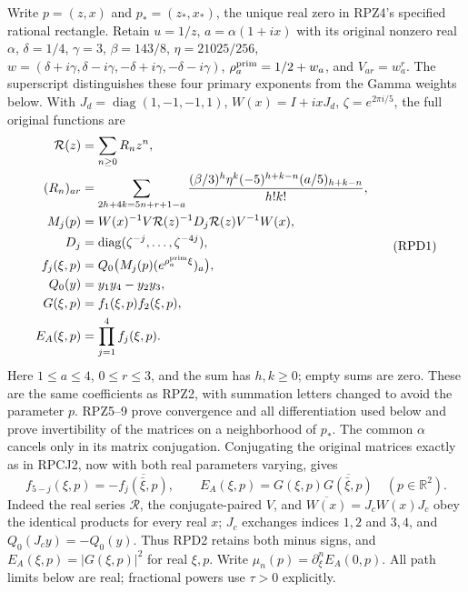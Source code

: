 Write $p=(z,x)$ and $p_*=(z_*,x_*)$, the unique real zero in RPZ4's
specified rational rectangle.  Retain $u=1/z$,
$a=\alpha(1+ix)$ with its original nonzero real $\alpha$,
$\delta=1/4$, $\gamma=3$, $\beta=143/8$, $\eta=21025/256$,
$w=(\delta+i\gamma,\delta-i\gamma,-\delta+i\gamma,-\delta-i\gamma)$,
$\rho_a^{\rm prim}=1/2+w_a$, and $V_{ar}=w_a^r$.
The superscript distinguishes these four primary exponents from the
Gamma weights below.  With $J_d=\operatorname{diag}(1,-1,-1,1)$,
$W(x)=I+ixJ_d$, $\zeta=e^{2\pi i/5}$, the full original functions are
\[
\begin{aligned}
 \mathcal R(z)&=\sum_{n\ge0}R_nz^n,\\
 (R_n)_{ar}&=\sum_{2h+4k=5n+r+1-a}
 \frac{(\beta/3)^h\eta^k(-5)^{h+k-n}(a/5)_{h+k-n}}{h!k!},\\
 M_j(p)&=W(x)^{-1}V\mathcal R(z)^{-1}D_j\mathcal R(z)V^{-1}W(x),\\
 D_j&=\operatorname{diag}(\zeta^{-j},\ldots,\zeta^{-4j}),\\
 f_j(\xi,p)&=Q_0\bigl(M_j(p)(e^{\rho_a^{\rm prim}\xi})_a\bigr),\\
 Q_0(y)&=y_1y_4-y_2y_3,\\
 G(\xi,p)&=f_1(\xi,p)f_2(\xi,p),\\
 E_A(\xi,p)&=\prod_{j=1}^4f_j(\xi,p).
\end{aligned}\tag{RPD1}
\]
Here $1\le a\le4$, $0\le r\le3$, and the sum has $h,k\ge0$;
empty sums are zero.  These are the same coefficients as RPZ2,
with summation letters changed to avoid the parameter $p$.
RPZ5--9 prove convergence and all differentiation used below and
prove invertibility of the matrices on a neighborhood of $p_*$.
The common $\alpha$ cancels only in its matrix conjugation.
Conjugating the original matrices exactly as in RPCJ2, now with
both real parameters varying, gives
\[
 f_{5-j}(\xi,p)=-\overline{f_j(\bar\xi,p)},\qquad
 E_A(\xi,p)=G(\xi,p)\overline{G(\bar\xi,p)}
 \quad(p\in\mathbb R^2).\tag{RPD2}
\]
Indeed the real series $\mathcal R$, the conjugate-paired $V$, and
$\overline{W(x)}=J_cW(x)J_c$ obey the identical products for every
real $x$; $J_c$ exchanges indices $1,2$ and $3,4$, and
$Q_0(J_cy)=-Q_0(y)$.  Thus RPD2 retains both minus signs, and
$E_A(\xi,p)=|G(\xi,p)|^2$ for real $\xi,p$.
Write $\mu_n(p)=\partial_\xi^nE_A(0,p)$.  All path limits below
are real; fractional powers use $\tau>0$ explicitly.

